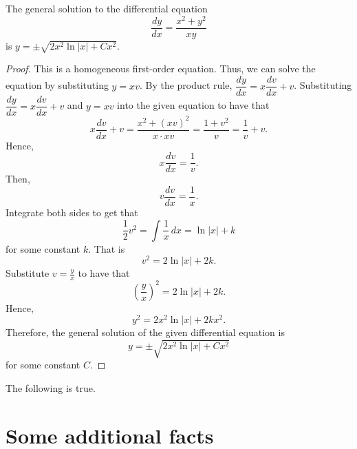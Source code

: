 \documentclass[ma493]{swumath}
\begin{document}
\begin{theorem}
The general solution to the differential equation 
\begin{equation}
\frac{dy}{dx} = \frac{x^2 + y^2}{xy}
\end{equation}
is $y = \pm \sqrt{2 x^2 \ln |x| + C x^2}$.
\end{theorem}
\begin{proof}
This is a homogeneous first-order equation. Thus, we can solve the equation by substituting $y = xv$. By the product rule, $\dfrac{dy}{dx} = x \dfrac{dv}{dx} + v$. Substituting $\dfrac{dy}{dx} = x \dfrac{dv}{dx} + v$ and $y = xv$ into the given equation to have that
\begin{equation}
x \dfrac{dv}{dx} + v = \frac{x^2 + (xv)^2}{x \cdot xv} = \frac{1 + v^2}{v} = \frac{1}{v} + v.
\end{equation}
Hence,
\begin{equation} x \dfrac{dv}{dx} = \frac{1}{v}. \end{equation}
Then,
\begin{equation} v \dfrac{dv}{dx} = \frac{1}{x}. \end{equation}
Integrate both sides to get that
\begin{equation} \frac{1}{2}v^2 = \int \frac{1}{x} \, dx = \ln |x| + k \end{equation}
for some constant $k$. That is 
\begin{equation} v^2 = 2 \ln |x| + 2k. \end{equation} 
Substitute $v = \frac{y}{x}$ to have that
\begin{equation} \left( \frac{y}{x} \right)^2 = 2 \ln |x| + 2k. \end{equation} 
Hence,
\begin{equation} y^2 = 2 x^2 \ln |x| + 2k x^2. \end{equation} 
Therefore, the general solution of the given differential equation is  
\[y = \pm \sqrt{2 x^2 \ln |x| + C x^2}\]
for some constant $C$.
\end{proof}

\begin{corollary}
The following is true.
\end{corollary}

\appendix

\chapter{Some additional facts}
\end{document}
